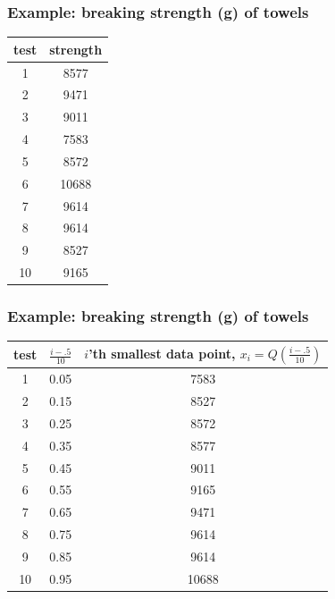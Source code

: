 \documentclass[handout]{beamer}
\numberwithin{equation}{section}
\begin{document}
\begin{frame}
\frametitle{Example: breaking strength (g) of towels}

\begin{table}[ht]
\centering
\begin{tabular}{cc}
  \hline
test & strength \\ 
  \hline
  1 & 8577 \\ 
    2 & 9471 \\ 
    3 & 9011 \\ 
    4 & 7583 \\ 
    5 & 8572 \\ 
    6 & 10688 \\ 
    7 & 9614 \\ 
    8 & 9614 \\ 
    9 & 8527 \\ 
   10 & 9165 \\ 
   \hline
\end{tabular}
\end{table}
\end{frame}

\begin{frame}
\frametitle{Example: breaking strength (g) of towels}

\begin{table}[ht]
\centering
\begin{tabular}{ccc}
 test & $\frac{i - .5}{10}$ & $i$'th smallest data point, $x_i = Q(\frac{i - .5}{10})$ \\ 
  \hline
  1 & 0.05 & 7583 \\ 
    2 & 0.15 & 8527 \\ 
    3 & 0.25 & 8572 \\ 
    4 & 0.35 & 8577 \\ 
    5 & 0.45 & 9011 \\ 
    6 & 0.55 & 9165 \\ 
    7 & 0.65 & 9471 \\ 
    8 & 0.75 & 9614 \\ 
    9 & 0.85 & 9614 \\ 
   10 & 0.95 & 10688 \\ 
  \end{tabular}
\end{table}
\end{frame}
\end{document}
